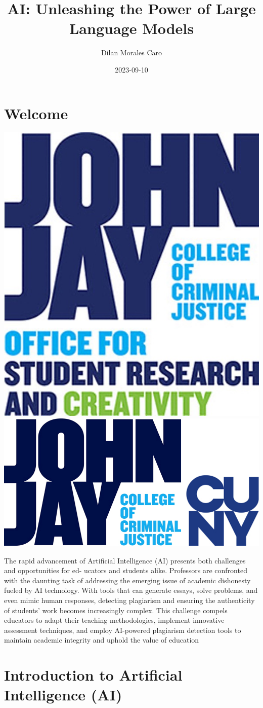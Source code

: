 \documentclass[
]{book}
\title{AI: Unleashing the Power of Large Language Models}
\author{Dilan Morales Caro}
\date{2023-09-10}
\begin{document}
\maketitle

{
\setcounter{tocdepth}{1}
\tableofcontents
}
\hypertarget{welcome}{%
\chapter*{Welcome}\label{welcome}}

\includegraphics[width=0.4\linewidth,height=0.2\textheight]{images/OSRC} \includegraphics[width=0.4\linewidth,height=0.2\textheight]{images/JohnJay}

The rapid advancement of Artificial Intelligence (AI) presents both challenges and opportunities for ed-
ucators and students alike. Professors are confronted with the daunting task of addressing the emerging
issue of academic dishonesty fueled by AI technology. With tools that can generate essays, solve problems,
and even mimic human responses, detecting plagiarism and ensuring the authenticity of students' work
becomes increasingly complex. This challenge compels educators to adapt their teaching methodologies, implement innovative assessment techniques, and employ AI-powered plagiarism detection tools to
maintain academic integrity and uphold the value of education

\hypertarget{introduction-to-artificial-intelligence-ai}{%
\chapter*{Introduction to Artificial Intelligence (AI)}\label{introduction-to-artificial-intelligence-ai}}
\end{document}
